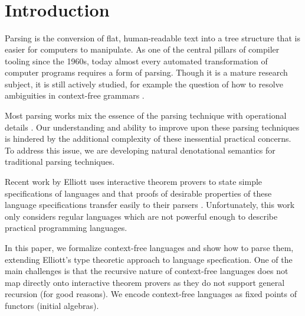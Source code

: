 \begin{code}[hide]%
\>[0]\AgdaSymbol{\{-\#}\AgdaSpace{}%
\AgdaSpace{}%
\AgdaSpace{}%
\AgdaSpace{}%
\AgdaSymbol{\#-\}}\<%
\\
\>[0]\AgdaSpace{}%
\AgdaSpace{}%
\<%
\\
%
\\[\AgdaEmptyExtraSkip]%
\>[0]\AgdaSpace{}%
\AgdaSpace{}%
\<%
\\
\>[0]\<%
\end{code}

\section{Introduction}

Parsing is the conversion of flat, human-readable text into a tree structure
that is easier for computers to manipulate.  As one of the central
pillars of compiler tooling since the 1960s, today almost every automated
transformation of computer programs requires a form of parsing.
Though it is a mature research subject, it is still actively studied, for example the question of how to resolve ambiguities in context-free grammars \cite{one-parser-to-rule-them-all}. 

Most parsing works mix the essence of the parsing technique with operational details . Our understanding and ability to improve upon these parsing techniques is hindered by the additional complexity of these inessential practical concerns. To address this issue, we are developing natural denotational semantics for traditional parsing techniques.

Recent work by Elliott uses interactive theorem provers to state simple specifications of languages and that proofs of desirable properties of these language specifications transfer easily to their parsers \cite{conal-languages}. Unfortunately, this work only considers regular languages which are not powerful enough to describe practical programming languages.


In this paper, we formalize context-free languages and show how to parse them, extending Elliott’s type theoretic approach to language specfication.  One of the main challenges is that the recursive nature of context-free languages does not map directly onto interactive theorem provers as they do not support general recursion (for good reasons). We encode context-free languages as fixed points of functors (initial algebras).

